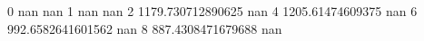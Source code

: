 0 nan nan
1 nan nan
2 1179.730712890625 nan
4 1205.61474609375 nan
6 992.6582641601562 nan
8 887.4308471679688 nan
